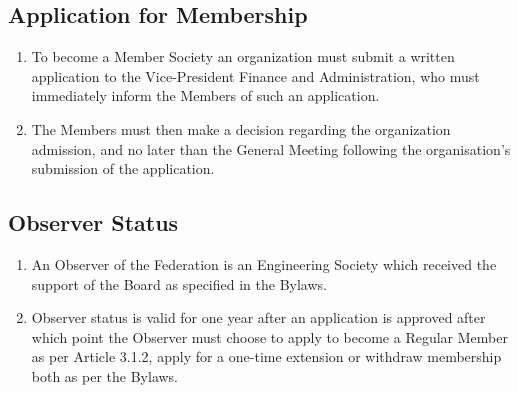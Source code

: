 \subsection{Application for Membership}
\label{application-for-membership}

\begin{enumerate}
 \item To become a Member Society an organization must submit a written application to the Vice-President Finance and Administration, who must immediately inform the Members of such an application.
 \item The Members must then make a decision regarding the organization admission, and no later than the General Meeting following the organisation's submission of the application.
\end{enumerate}

\subsection{Observer Status}
\label{observer-status-engineering-society}

\begin{enumerate}
 \item An Observer of the Federation is an Engineering Society which received the support of the Board as specified in the Bylaws.
 \item Observer status is valid for one year after an application is approved after which point the Observer must choose to apply to become a Regular Member as per Article 3.1.2, apply for a one-time extension or withdraw membership both as per the Bylaws.
\end{enumerate}
